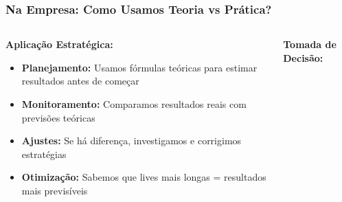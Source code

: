 \documentclass[aspectratio=169,12pt]{beamer}
\begin{document}
\begin{frame}
    \frametitle{Na Empresa: Como Usamos Teoria vs Prática?}
    
    \begin{columns}
        \begin{column}{0.6\textwidth}
            \textbf{\Large Aplicação Estratégica:}
            \vspace{0.5cm}
            
            \begin{itemize}
                \item[\faIcon{calculator}] \textcolor{azulprincipal}{\textbf{Planejamento:}} Usamos fórmulas teóricas para estimar resultados antes de começar
                \vspace{0.3cm}
                
                \item[\faIcon{eye}] \textcolor{azulprincipal}{\textbf{Monitoramento:}} Comparamos resultados reais com previsões teóricas
                \vspace{0.3cm}
                
                \item[\faIcon{adjust}] \textcolor{azulprincipal}{\textbf{Ajustes:}} Se há diferença, investigamos e corrigimos estratégias
                \vspace{0.3cm}
                
                \item[\faIcon{chart-line}] \textcolor{azulprincipal}{\textbf{Otimização:}} Sabemos que lives mais longas = resultados mais previsíveis
            \end{itemize}
        \end{column}
        
        \begin{column}{0.4\textwidth}
            \begin{center}
                \textbf{\large Tomada de Decisão:}
                \vspace{0.3cm}
                
\end{center}
\end{column}
\end{columns}
\end{frame}
\end{document}
